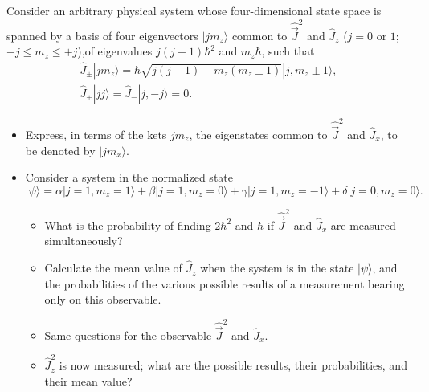 \documentclass[10pt,a4paper]{article}
\newenvironment{problem}[2][Problem]{\begin{trivlist}
\item[\hskip \labelsep {\bfseries #1}\hskip \labelsep {\bfseries #2.}]}{\end{trivlist}}
\begin{document}
\begin{problem}{1}
[C-T Exercise 6-2] Consider an arbitrary physical system whose four-dimensional state space is spanned by a basis of four eigenvectors $|jm_z\rangle$ common to $\hat{\vec{J}}^2$ and $\hat{J}_z$ ($j=0$ or $1$; $-j\leq m_z\leq+j$),of eigenvalues $j(j+1)\hbar^2$ and $m_z\hbar$, such that
\begin{gather*}
\hat{J}_{\pm}|jm_z\rangle=\hbar\sqrt{j(j+1)-m_z(m_z\pm1)}|j,m_z\pm1\rangle,\\
\hat{J}_+|jj\rangle=\hat{J}_-|j,-j\rangle=0.
\end{gather*}
\begin{itemize}
\item[(a)] Express, in terms of the kets $jm_z$, the eigenstates common to $\hat{\vec{J}}^2$ and $\hat{J}_x$, to be denoted by $|jm_x\rangle$.
\item[(b)] Consider a system in the normalized state
\[
|\psi\rangle=\alpha|j=1,m_z=1\rangle+\beta|j=1,m_z=0\rangle+\gamma|j=1,m_z=-1\rangle+\delta|j=0,m_z=0\rangle.
\]
\begin{itemize}
\item[i.] What is the probability of finding $2\hbar^2$ and $\hbar$ if $\hat{\vec{J}}^2$ and $\hat{J}_x$ are measured simultaneously?
\item[ii.] Calculate the mean value of $\hat{J}_z$ when the system is in the state $|\psi\rangle$, and the probabilities of the various possible results of a measurement bearing only on this observable.
\item[iii.] Same questions for the observable $\hat{\vec{J}}^2$ and $\hat{J}_x$.
\item[iv.] $\hat{J}_z^2$ is now measured; what are the possible results, their probabilities, and their mean value?
\end{itemize}
\end{itemize}
\end{problem}
\end{document}
